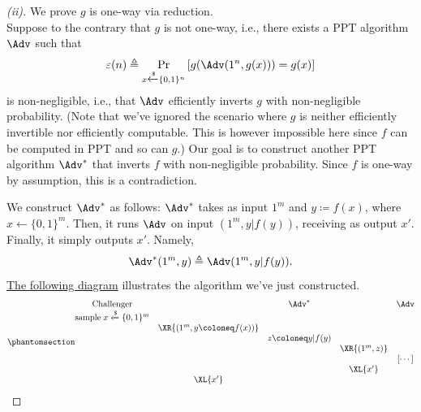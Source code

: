 \begin{proof}[(ii)]
    We prove $g$ is one-way via reduction.\\
    Suppose to the contrary that $g$ is not one-way, i.e., there exists a PPT algorithm $\Adv$ such that
    \[
    \varepsilon(n)\triangleq \Pr_{x\xleftarrow{\$}\{0,1\}^n}\left[g(\Adv(1^n, g(x))) = g(x)\right]
    \]
    is non-negligible, i.e., that $\Adv$ efficiently inverts $g$ with non-negligible probability. (Note that we've ignored the scenario where $g$ is neither efficiently invertible nor efficiently computable. This is however impossible here since $f$ can be computed in PPT and so can $g$.) Our goal is to construct another PPT algorithm $\Adv^\ast$ that inverts $f$ with non-negligible probability. Since $f$ is one-way by assumption, this is a contradiction.

    We construct $\Adv^\ast$ as follows: $\Adv^\ast$ takes as input $1^{m}$ and $y\coloneq f(x)$, where $x\xleftarrow{}\{0,1\}^m$. Then, it runs $\Adv$ on input $(1^{m}, y|f(y))$, receiving as output $x'$. Finally, it simply outputs $x'$. Namely,
    \[
    \Adv^\ast(1^{m}, y) \triangleq \Adv(1^{m}, y|f(y)).
    \]
    \hyperref[diag:adv2]{The following diagram} illustrates the algorithm we've just constructed.
    \[\phantomsection\label{diag:adv2}
        \begin{array}{@{} c c c c c @{}}
        \textrm{Challenger} && \Adv^\ast & & \Adv \\
        \text{sample}\;x\xleftarrow{\$}\{0,1\}^m &&&&\\
        &\XR{(1^m, y\coloneq f(x))} &&&\\
        && z\coloneq y|f(y) &&\\
        &&&\XR{(1^{m}, z)} &\\
        &&&& [\cdots]\\
        &&&\XL{x'} &\\
        &\XL{x'} &&&
        \end{array}
    \]


\end{proof}
